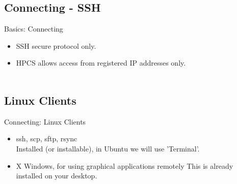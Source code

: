 \subsection{Connecting - SSH}
\begin{frame}{Basics: Connecting}
\begin{itemize}
\item SSH secure protocol only.\hfill\\
\item<3-> HPCS allows access from registered IP addresses only.\hfill\\
\hfill\\
\end{itemize}
\end{frame}

\subsection{Linux Clients}
\begin{frame}{Connecting: Linux Clients}
\begin{itemize}
\item {\color<2->{red}ssh}, scp, sftp, {rsync}\hfill\\
\alert{\small Installed (or installable), in Ubuntu we will use 'Terminal'.}
\item {X Windows, for using graphical applications remotely}
\alert{\small This is already installed on your desktop.}
\end{itemize}
\end{frame}

